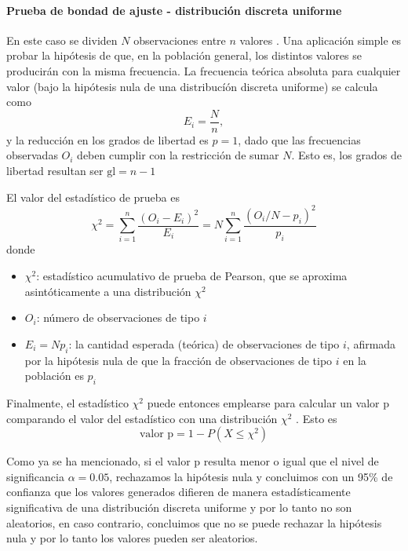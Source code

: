 \paragraph{Prueba de bondad de ajuste - distribución discreta uniforme}
En este caso se dividen $N$ observaciones entre $n$ valores \cite{enwiki2022pearson}. Una aplicación simple es probar la hipótesis de que, en la población general, los distintos valores se producirán con la misma frecuencia. La frecuencia teórica absoluta para cualquier valor (bajo la hipótesis nula de una distribucíón discreta uniforme) se calcula como
\begin{equation*}
  E_i=\frac{N}{n},
\end{equation*}
y la reducción en los grados de libertad es $p=1$, dado que las frecuencias observadas $O_{i}$ deben cumplir con la restricción de sumar $N$. Esto es, los grados de libertad resultan ser $\text{gl} = n - 1$

El valor del estadístico de prueba es
\begin{equation}
\label{eq:estadistico-chi2}
\chi^{2} = \sum_{i=1}^{n}{\frac{(O_{i}-E_{i})^{2}}{E_{i}}} = N\sum_{i=1}^{n}{\frac{\left(O_{i}/N-p_{i}\right)^{2}}{p_{i}}}
\end{equation}
donde
\begin{itemize}
  \item $\chi^2$: estadístico acumulativo de prueba de Pearson, que se aproxima asintóticamente a una distribución $\chi^{2}$
  \item $O_{i}$: número de observaciones de tipo $i$
  \item $E_{i} = Np_{i}$: la cantidad esperada (teórica) de observaciones de tipo $i$, afirmada por la hipótesis nula de que la fracción de observaciones de tipo $i$ en la población es $p_{i}$
\end{itemize}

Finalmente, el estadístico $\chi^{2}$ puede entonces emplearse para calcular un valor p comparando el valor del estadístico con una distribución $\chi^{2}$ \cite{enwiki2022pearson}. Esto es
\begin{equation}
  \label{eq:p-value}
  \text{valor p} = 1 - P(X \le \chi^2)
\end{equation}

Como ya se ha mencionado, si el valor p resulta menor o igual que el nivel de significancia $\alpha = 0.05$, rechazamos la hipótesis nula y concluimos con un 95\% de confianza que los valores generados difieren de manera estadísticamente significativa de una distribución discreta uniforme y por lo tanto no son aleatorios, en caso contrario, concluimos que no se puede rechazar la hipótesis nula y por lo tanto los valores pueden ser aleatorios.


